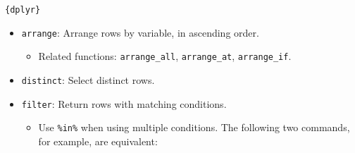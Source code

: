 \documentclass[]{book}
\newenvironment{Shaded}{\begin{snugshade}}{\end{snugshade}}
\newcommand{\KeywordTok}[1]{\textcolor[rgb]{0.13,0.29,0.53}{\textbf{#1}}}
\newcommand{\NormalTok}[1]{#1}
\newcommand{\OperatorTok}[1]{\textcolor[rgb]{0.81,0.36,0.00}{\textbf{#1}}}
\newcommand{\StringTok}[1]{\textcolor[rgb]{0.31,0.60,0.02}{#1}}
\providecommand{\tightlist}{%
  \setlength{\itemsep}{0pt}\setlength{\parskip}{0pt}}
\begin{document}
\texttt{\{dplyr\}}

\begin{itemize}
\tightlist
\item
  \texttt{arrange}: Arrange rows by variable, in ascending order.

  \begin{itemize}
  \tightlist
  \item
    Related functions: \texttt{arrange\_all}, \texttt{arrange\_at}, \texttt{arrange\_if}.
  \end{itemize}
\item
  \texttt{distinct}: Select distinct rows.
\item
  \texttt{filter}: Return rows with matching conditions.

  \begin{itemize}
  \tightlist
  \item
    Use \texttt{\%in\%} when using multiple \texttt{\textbar{}} conditions. The following two commands, for example, are equivalent:
  \end{itemize}
\end{itemize}

\begin{Shaded}
\end{Shaded}
\end{document}
